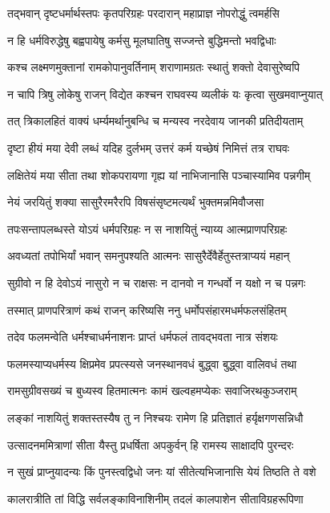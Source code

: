 \twolineshloka
{तद्भवान् दृष्टधर्मार्थस्तपः कृतपरिग्रहः}
{परदारान् महाप्राज्ञ नोपरोद्धुं त्वमर्हसि}

\twolineshloka
{न हि धर्मविरुद्धेषु बह्वपायेषु कर्मसु}
{मूलघातिषु सज्जन्ते बुद्धिमन्तो भवद्विधाः}

\twolineshloka
{कश्च लक्ष्मणमुक्तानां रामकोपानुवर्तिनाम्}
{शराणामग्रतः स्थातुं शक्तो देवासुरेष्वपि}

\twolineshloka
{न चापि त्रिषु लोकेषु राजन् विद्येत कश्चन}
{राघवस्य व्यलीकं यः कृत्वा सुखमवाप्नुयात्}

\twolineshloka
{तत् त्रिकालहितं वाक्यं धर्म्यमर्थानुबन्धि च}
{मन्यस्व नरदेवाय जानकी प्रतिदीयताम्}

\twolineshloka
{दृष्टा हीयं मया देवी लब्धं यदिह दुर्लभम्}
{उत्तरं कर्म यच्छेषं निमित्तं तत्र राघवः}

\twolineshloka
{लक्षितेयं मया सीता तथा शोकपरायणा}
{गृह्य यां नाभिजानासि पञ्चास्यामिव पन्नगीम्}

\twolineshloka
{नेयं जरयितुं शक्या सासुरैरमरैरपि}
{विषसंसृष्टमत्यर्थं भुक्तमन्नमिवौजसा}

\twolineshloka
{तपःसन्तापलब्धस्ते योऽयं धर्मपरिग्रहः}
{न स नाशयितुं न्याय्य आत्मप्राणपरिग्रहः}

\twolineshloka
{अवध्यतां तपोभिर्यां भवान् समनुपश्यति}
{आत्मनः सासुरैर्देवैर्हेतुस्तत्राप्ययं महान्}

\twolineshloka
{सुग्रीवो न हि देवोऽयं नासुरो न च राक्षसः}
{न दानवो न गन्धर्वो न यक्षो न च पन्नगः}

\twolineshloka
{तस्मात् प्राणपरित्राणं कथं राजन् करिष्यसि}
{ननु धर्मोपसंहारमधर्मफलसंहितम्}

\twolineshloka
{तदेव फलमन्वेति धर्मश्चाधर्मनाशनः}
{प्राप्तं धर्मफलं तावद्भवता नात्र संशयः}

\twolineshloka
{फलमस्याप्यधर्मस्य क्षिप्रमेव प्रपत्स्यसे}
{जनस्थानवधं बुद्ध्वा बुद्ध्वा वालिवधं तथा}

\twolineshloka
{रामसुग्रीवसख्यं च बुध्यस्व हितमात्मनः}
{कामं खल्वहमप्येकः सवाजिरथकुञ्जराम्}

\twolineshloka
{लङ्कां नाशयितुं शक्तस्तस्यैष तु न निश्चयः}
{रामेण हि प्रतिज्ञातं हर्यृक्षगणसन्निधौ}

\twolineshloka
{उत्सादनममित्राणां सीता यैस्तु प्रधर्षिता}
{अपकुर्वन् हि रामस्य साक्षादपि पुरन्दरः}

\twolineshloka
{न सुखं प्राप्नुयादन्यः किं पुनस्त्वद्विधो जनः}
{यां सीतेत्यभिजानासि येयं तिष्ठति ते वशे}

\twolineshloka
{कालरात्रीति तां विद्धि सर्वलङ्काविनाशिनीम्}
{तदलं कालपाशेन सीताविग्रहरूपिणा}

